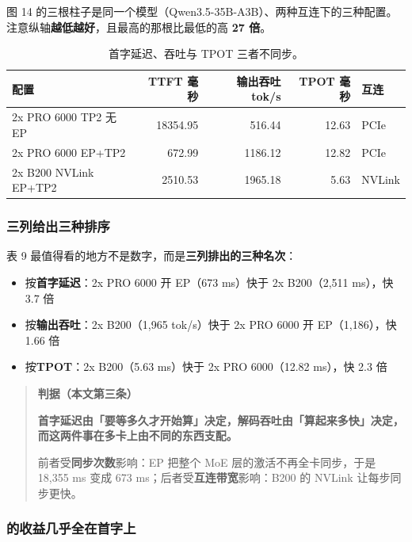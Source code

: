 图 14 的三根柱子是同一个模型（Qwen3.5-35B-A3B）、两种互连下的三种配置。注意纵轴\textbf{越低越好}，且最高的那根比最低的高 \textbf{27 倍}。


\begin{table}[t]
\centering
\footnotesize
\setlength{\tabcolsep}{4pt}
\caption{首字延迟、吞吐与 TPOT 三者不同步。}
\label{tab:10}
\begin{tabular}{lrrrl}
\toprule
配置 & TTFT 毫秒 & 输出吞吐 tok/s & TPOT 毫秒 & 互连 \\
\midrule
2x PRO 6000 TP2 无 EP & 18354.95 & 516.44 & 12.63 & PCIe \\
2x PRO 6000 EP+TP2 & 672.99 & 1186.12 & 12.82 & PCIe \\
2x B200 NVLink EP+TP2 & 2510.53 & 1965.18 & 5.63 & NVLink \\
\bottomrule
\end{tabular}
\end{table}

\subsubsection{三列给出三种排序}

表 9 最值得看的地方不是数字，而是\textbf{三列排出的三种名次}：


\begin{itemize}
  \item 按\textbf{首字延迟}：2x PRO 6000 开 EP（673 ms）快于 2x B200（2,511 ms），快 3.7 倍
  \item 按\textbf{输出吞吐}：2x B200（1,965 tok/s）快于 2x PRO 6000 开 EP（1,186），快 1.66 倍
  \item 按\textbf{TPOT}：2x B200（5.63 ms）快于 2x PRO 6000（12.82 ms），快 2.3 倍
\end{itemize}

\begin{quote}\small
\textbf{ 判据（本文第三条）}

\textbf{首字延迟由「要等多久才开始算」决定，解码吞吐由「算起来多快」决定，而这两件事在多卡上由不同的东西支配。}

前者受\textbf{同步次数}影响：EP 把整个 MoE 层的激活不再全卡同步，于是 18,355 ms 变成 673 ms；后者受\textbf{互连带宽}影响：B200 的 NVLink 让每步同步更快。

\end{quote}

\subsubsection{的收益几乎全在首字上}

